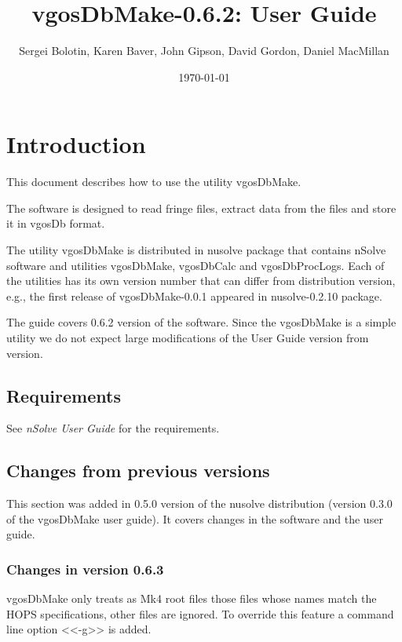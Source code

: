 \documentclass [10pt,letterpaper]{report}
\newcommand{\nuSolve}{\greektext n\latintext Solve}
\newcommand{\thisVersion}{0.6.2}
\begin{document}
\title{vgosDbMake-\thisVersion{}: User Guide}

\author{
Sergei Bolotin,
Karen Baver,
John Gipson,
David Gordon,
Daniel MacMillan
}

\date{\today}


\maketitle

\tableofcontents


\def\leftSp      {48mm}
\def\riteSp     {113mm}


\chapter{Introduction}
\label{intro}

This document describes how to use the utility vgosDbMake.

The software is designed to read fringe files, extract data from the files
and store it in vgosDb format.

The utility vgosDbMake is distributed in nusolve package that contains \nuSolve{}
software and utilities vgosDbMake, vgosDbCalc and vgosDbProcLogs. Each of the
utilities has its own version number that can differ from distribution version,
e.g., the first release of vgosDbMake-0.0.1 appeared in nusolve-0.2.10 package.

The guide covers \thisVersion{} version of the software. Since the vgosDbMake
is a simple utility we do not expect large modifications of the User Guide version
from version.


\section{Requirements}
\label{intro_reqs}

See \emph{\nuSolve{} User Guide} for the requirements.


\section{Changes from previous versions}
\label{intro_changes}

This section was added in 0.5.0 version of the nusolve distribution (version 0.3.0
of the vgosDbMake user guide). It covers changes in the software and the user guide.


\subsection{Changes in version 0.6.3}
vgosDbMake only treats as Mk4 root files those files whose names match the HOPS
specifications, other files are ignored. To override this feature a command line
option <<-g>> is added.
\end{document}
